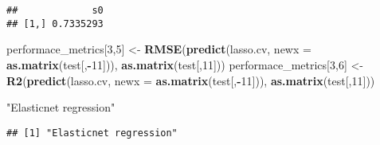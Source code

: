 \documentclass[
]{article}
\newenvironment{Shaded}{\begin{snugshade}}{\end{snugshade}}
\newcommand{\DataTypeTok}[1]{\textcolor[rgb]{0.13,0.29,0.53}{#1}}
\newcommand{\DecValTok}[1]{\textcolor[rgb]{0.00,0.00,0.81}{#1}}
\newcommand{\FloatTok}[1]{\textcolor[rgb]{0.00,0.00,0.81}{#1}}
\newcommand{\KeywordTok}[1]{\textcolor[rgb]{0.13,0.29,0.53}{\textbf{#1}}}
\newcommand{\NormalTok}[1]{#1}
\newcommand{\OperatorTok}[1]{\textcolor[rgb]{0.81,0.36,0.00}{\textbf{#1}}}
\newcommand{\StringTok}[1]{\textcolor[rgb]{0.31,0.60,0.02}{#1}}
\begin{document}
\begin{verbatim}
##             s0
## [1,] 0.7335293
\end{verbatim}

\begin{Shaded}
\begin{Highlighting}[]
\NormalTok{performace_metrics[}\DecValTok{3}\NormalTok{,}\DecValTok{5}\NormalTok{] <-}\StringTok{ }\KeywordTok{RMSE}\NormalTok{(}\KeywordTok{predict}\NormalTok{(lasso.cv, }\DataTypeTok{newx =} \KeywordTok{as.matrix}\NormalTok{(test[,}\OperatorTok{-}\DecValTok{11}\NormalTok{])), }\KeywordTok{as.matrix}\NormalTok{(test[,}\DecValTok{11}\NormalTok{]))}
\NormalTok{performace_metrics[}\DecValTok{3}\NormalTok{,}\DecValTok{6}\NormalTok{] <-}\StringTok{ }\KeywordTok{R2}\NormalTok{(}\KeywordTok{predict}\NormalTok{(lasso.cv, }\DataTypeTok{newx =} \KeywordTok{as.matrix}\NormalTok{(test[,}\OperatorTok{-}\DecValTok{11}\NormalTok{])), }\KeywordTok{as.matrix}\NormalTok{(test[,}\DecValTok{11}\NormalTok{]))}
  
\StringTok{"Elasticnet regression"}
\end{Highlighting}
\end{Shaded}

\begin{verbatim}
## [1] "Elasticnet regression"
\end{verbatim}

\begin{Shaded}
\end{Shaded}
\end{document}

